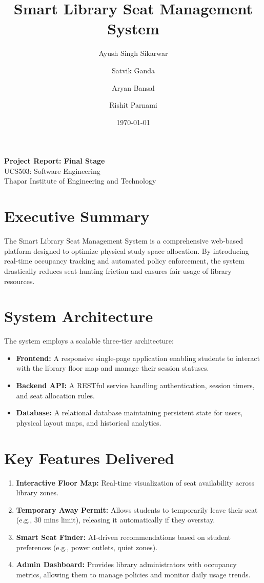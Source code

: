 \documentclass[11pt,a4paper]{article}
\title{Smart Library Seat Management System}
\author{
  Ayush Singh Sikarwar \and Satvik Ganda \and Aryan Bansal \and Rishit Parnami
}
\date{\today}
\begin{document}
\maketitle
\begin{center}
\large \textbf{Project Report: Final Stage} \\
\vspace{0.5cm}
UCS503: Software Engineering \\
Thapar Institute of Engineering and Technology
\end{center}

\section{Executive Summary}
The Smart Library Seat Management System is a comprehensive web-based platform designed to optimize physical study space allocation. By introducing real-time occupancy tracking and automated policy enforcement, the system drastically reduces seat-hunting friction and ensures fair usage of library resources.

\section{System Architecture}
The system employs a scalable three-tier architecture:
\begin{itemize}
    \item \textbf{Frontend:} A responsive single-page application enabling students to interact with the library floor map and manage their session statuses.
    \item \textbf{Backend API:} A RESTful service handling authentication, session timers, and seat allocation rules.
    \item \textbf{Database:} A relational database maintaining persistent state for users, physical layout maps, and historical analytics.
\end{itemize}

\section{Key Features Delivered}
\begin{enumerate}
    \item \textbf{Interactive Floor Map:} Real-time visualization of seat availability across library zones.
    \item \textbf{Temporary Away Permit:} Allows students to temporarily leave their seat (e.g., 30 mins limit), releasing it automatically if they overstay.
    \item \textbf{Smart Seat Finder:} AI-driven recommendations based on student preferences (e.g., power outlets, quiet zones).
    \item \textbf{Admin Dashboard:} Provides library administrators with occupancy metrics, allowing them to manage policies and monitor daily usage trends.
\end{enumerate}
\end{document}
